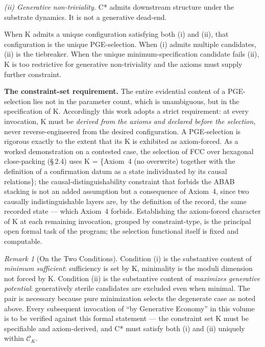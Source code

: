 \documentclass[11pt,oneside]{report}
\theoremstyle{definition}
\theoremstyle{remark}
\newtheorem{remark}[theorem]{Remark}
\begin{document}
\emph{(ii) Generative non-triviality.} C* admits downstream structure
under the substrate dynamics. It is not a generative dead-end.

When K admits a unique configuration satisfying both (i) and (ii), that
configuration is the unique PGE-selection. When (i) admits multiple
candidates, (ii) is the tiebreaker. When the unique
minimum-specification candidate fails (ii), K is too restrictive for
generative non-triviality and the axioms must supply further constraint.

\textbf{The constraint-set requirement.} The entire evidential content of a
PGE-selection lies not in the parameter count, which is unambiguous, but in the
specification of K. Accordingly this work adopts a strict requirement: at every
invocation, K must be \emph{derived from the axioms and declared before the
selection}, never reverse-engineered from the desired configuration. A
PGE-selection is rigorous exactly to the extent that its K is exhibited as
axiom-forced. As a worked demonstration on a contested case, the selection of
FCC over hexagonal close-packing (\S\,2.4) uses K = \{Axiom~4 (no overwrite)
together with the definition of a confirmation datum as a state individuated by
its causal relations\}; the causal-distinguishability constraint that forbids the
ABAB stacking is not an added assumption but a consequence of Axiom~4, since two
causally indistinguishable layers are, by the definition of the record, the same
recorded state --- which Axiom~4 forbids. Establishing the axiom-forced character
of K at each remaining invocation, grouped by constraint-type, is the principal
open formal task of the program; the selection functional itself is fixed and
computable.

\begin{remark}[On the Two Conditions]
Condition (i) is the
substantive content of \emph{minimum sufficient}: sufficiency is set by
K, minimality is the moduli dimension not forced by K. Condition (ii) is
the substantive content of \emph{maximizes generative potential}:
generatively sterile candidates are excluded even when minimal. The pair
is necessary because pure minimization selects the degenerate case as
noted above. Every subsequent invocation of ``by Generative Economy'' in
this volume is to be verified against this formal statement --- the
constraint set K must be specifiable and axiom-derived, and C* must
satisfy both (i) and (ii) uniquely within \ensuremath{\mathcal{C}_{K}.}
\end{remark}
\end{document}
